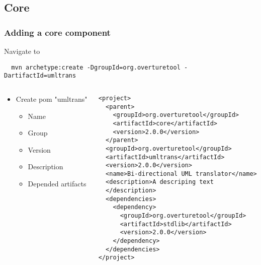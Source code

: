 \subsection{Core}
\begin{frame}[fragile]
  \frametitle{Adding a core component}
  
  Navigate to 
   
  \begin{lstlisting}
  mvn archetype:create -DgroupId=org.overturetool -DartifactId=umltrans
  \end{lstlisting}

\begin{columns}
\begin{column}{5cm}
	\begin{itemize}
		\item Create pom "umltrans"
		\begin{itemize}
			\item Name
			\item Group
			\item Version
			\item Description
			\item Depended artifacts
		\end{itemize}
		
	 \end{itemize}
\end{column}
\begin{column}{6cm}
	\pause
	\begin{lstlisting}
<project>
  <parent>
    <groupId>org.overturetool</groupId>
    <artifactId>core</artifactId>
    <version>2.0.0</version>
  </parent>
  <groupId>org.overturetool</groupId>
  <artifactId>umltrans</artifactId>
  <version>2.0.0</version>
  <name>Bi-directional UML translator</name>
  <description>A descriping text
  </description>
  <dependencies>
    <dependency>
      <groupId>org.overturetool</groupId>
      <artifactId>stdlib</artifactId>
      <version>2.0.0</version>
    </dependency>
  </dependencies>
</project>
	\end{lstlisting}
\end{column}
\end{columns}


\end{frame}

